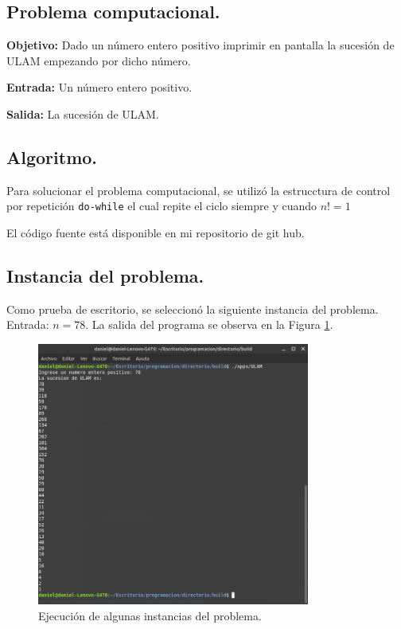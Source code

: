 \documentclass[12pt,letterpaper]{article}
\begin{document}
\subsection{Problema computacional.}
\textbf{Objetivo:} Dado un n\'umero entero positivo imprimir en pantalla la sucesi\'on de ULAM empezando por dicho n\'umero.

\textbf{Entrada:} Un n\'umero entero positivo.

\textbf{Salida:} La sucesi\'on de ULAM.

\subsection{Algoritmo.}
Para solucionar el problema computacional, se utiliz\'o la estrucctura de control por repetici\'on \texttt{do-while} el cual repite el ciclo siempre y cuando $n!=1$


El código fuente está disponible en mi repositorio de git hub. \cite{url:ULAM}

\subsection{Instancia del problema.}
Como prueba de escritorio, se seleccionó la siguiente instancia del problema. Entrada: $n=78$. La salida del programa se observa en la Figura \ref{fig:ULAM}.
\begin{figure}[ht!]
  \centering
  \includegraphics[width=0.8\textwidth]{figures/ULAM}
  \caption{Ejecución de algunas instancias del problema.}
  \label{fig:ULAM}
\end{figure}
\newpage
\end{document}
